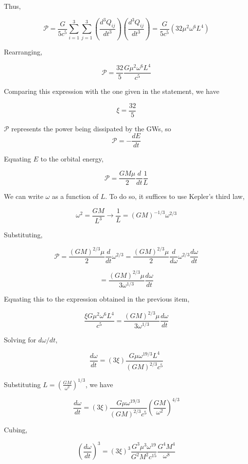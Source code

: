 \documentclass[11pt]{article}
\begin{document}
\begin{pproblem}
\begin{pssolution*}{}{}
\begin{alternativas}
        Thus,

        \[\mathcal{P} = \frac{G}{5c^5} \sum_{i=1}^3 \sum_{j=1}^3 \left( \frac{d^3 Q_{ij}}{dt^3} \right) \left( \frac{d^3 Q_{ij}}{dt^3} \right) = \frac{G}{5c^5}(32\mu^2\omega^6 L^4)\]

        Rearranging,

        \[\mathcal{P} = \frac{32}{5}\frac{G\mu^2\omega^6L^4}{c^5}\]

        Comparing this expression with the one given in the statement, we have

        \[\boxed{\xi = \frac{32}{5}}\]

        \item \(\mathcal{P}\) represents the power being dissipated by the GWs, so
        \[\mathcal{P} = -\frac{dE}{dt}\]

        Equating \(E\) to the orbital energy,

        \[\mathcal{P} = \frac{GM\mu}{2} \frac{d}{dt}\frac{1}{L}\]

        We can write \(\omega\) as a function of \(L\). To do so, it suffices to use Kepler's third law,


        \[\omega^2 = \frac{GM}{L^3} \rightarrow \frac{1}{L }= (GM)^{-1/3}\omega^{2/3}\]

        Substituting,

        \[\mathcal{P} = \frac{(GM)^{2/3}\mu}{2}\frac{d}{dt}\omega^{2/3} = \frac{(GM)^{2/3}\mu}{2}\frac{d}{d\omega}\omega^{2/3}\frac{d\omega}{dt}\]

        \[= \frac{(GM)^{2/3}\mu}{3\omega^{1/3}}\frac{d\omega}{dt}\]

        Equating this to the expression obtained in the previous item,

        \[\frac{\xi G\mu^2\omega^6L^4}{c^5} = \frac{(GM)^{2/3}\mu}{3\omega^{1/3}}\frac{d\omega}{dt}\]

        Solving for \(d\omega/dt\),
        
        \[\frac{d\omega }{dt} = (3\xi)\frac{G\mu \omega^{19/3}L^4}{(GM)^{2/3}c^5}\]

        Substituting \(L = \left(\frac{GM}{\omega^2}\right)^{1/3}\), we have

        \[\frac{d\omega}{dt} = (3\xi)\frac{G\mu \omega^{19/3}}{(GM)^{2/3}c^5}\left(\frac{GM}{\omega^2}\right)^{4/3}\]

        Cubing,

        \[\left(\frac{d\omega}{dt}\right)^{3} = (3\xi)^3\frac{G^3\mu^3\omega^{19}}{G^2M^2c^{15}}\frac{G^4M^4}{\omega^8}\]


\end{alternativas}
\end{pssolution*}
\end{pproblem}
\end{document}
